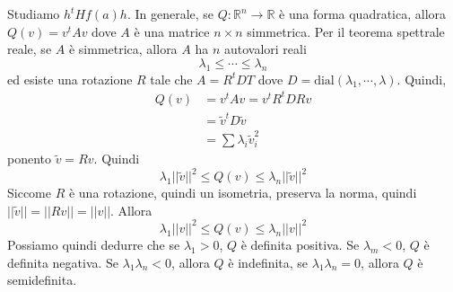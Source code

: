 \documentclass[a4paper]{article}
\begin{document}

Studiamo \(h^t Hf(a)h\).
In generale, se \(Q \colon \mathbb{R}^n \to \mathbb{R}\)
è una forma quadratica, allora \(Q(v) = v^t A v\) dove \(A\)
è una matrice \(n\times n\) simmetrica.
Per il teorema spettrale reale, se \(A\)
è simmetrica, allora \(A\) ha \(n\)
autovalori reali
\[
    \lambda_1 \leq \cdots \leq \lambda_n
\]
ed esiste una rotazione \(R\)
tale che \(A = R^t D T\)
dove \(D = \text{dial}(\lambda_1, \cdots, \lambda)\).
Quindi,
\begin{align*}
    Q(v) &= v^t A v = v^t R^t DR v \\
    &= \tilde{v}^t D \tilde{v} \\
    &= \sum \lambda_i \tilde{v}_i^2
\end{align*}
ponento \(\tilde{v} = Rv\).
Quindi
\[
    \lambda_1 ||\tilde{v}||^2 \leq Q(v) \leq \lambda_n ||\tilde{v}||^2
\]
Siccome \(R\) è una rotazione, quindi un isometria, preserva la norma,
quindi \(||\tilde{v}|| = ||Rv|| = ||v||\). Allora
\[
    \lambda_1 ||v||^2 \leq Q(v) \leq \lambda_n ||v||^2
\]
Possiamo quindi dedurre che se \(\lambda_1 > 0\),
\(Q\) è definita positiva. Se \(\lambda_m < 0\),
\(Q\) è definita negativa.
Se \(\lambda_1 \lambda_n < 0\), allora \(Q\) è indefinita,
se \(\lambda_1 \lambda_n = 0\), allora \(Q\) è semidefinita.
\end{document}
